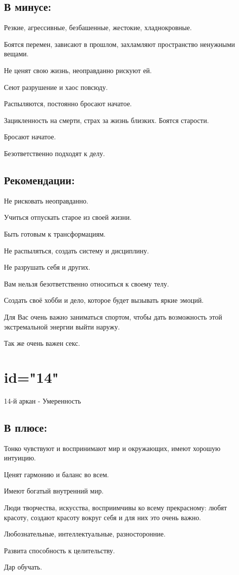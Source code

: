 \subsection{В минусе:}
\item Резкие, агрессивные, безбашенные, жестокие, хладнокровные.
\item Боятся перемен, зависают в прошлом, захламляют пространство ненужными вещами.
\item Не ценят свою жизнь, неоправданно рискуют ей.
\item Сеют разрушение и хаос повсюду.
\item Распыляются, постоянно бросают начатое.
\item Зацикленность на смерти, страх за жизнь близких. Боятся старости.
\item Бросают начатое.
\item Безответственно подходят к делу.
\endsubsection

\subsection{Рекомендации:}
\item Не рисковать неоправданно.
\item Учиться отпускать старое из своей жизни.
\item Быть готовым к трансформациям.
\item Не распыляться, создать систему и дисциплину.
\item Не разрушать себя и других.
\item Вам нельзя безответственно относиться к своему телу.
\item Создать своё хобби и дело, которое будет вызывать яркие эмоций.
\item Для Вас очень важно заниматься спортом, чтобы дать возможность этой экстремальной энергии выйти наружу.
\item Так же очень важен секс.
\endsubsection

\endsection

\section{id="14"}{14-й аркан - Умеренность}

\subsection{В плюсе:}
\item Тонко чувствуют и воспринимают мир и окружающих, имеют хорошую интуицию.
\item Ценят гармонию и баланс во всем.
\item Имеют богатый внутренний мир.
\item Люди творчества, искусства, восприимчивы ко всему прекрасному: любят красоту, создают красоту вокруг себя и для них это очень важно.
\item Любознательные, интеллектуальные, разносторонние.
\item Развита способность к целительству.
\item Дар обучать.
\endsubsection

